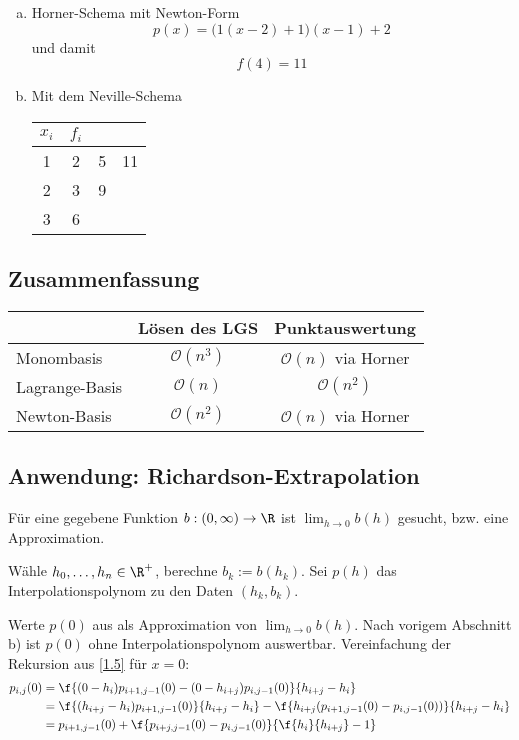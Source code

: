 \documentclass[11pt]{scrbook}
\begin{document}
\begin{ex*}
	\begin{enumerate}[a)]
		\item 
			Horner-Schema mit Newton-Form
			\[
				p(x) = \Big(1(x-2)+1\Big)(x-1) +2
			\]
			und damit
			\[
				f(4) = 11
			\]
		\item
			Mit dem Neville-Schema
			\begin{tabular}{cccc}
				$x_i$ & $f_i$ &  & \\ \hline
				1 & 2 & 5 & 11\\
				2 & 3 & 9\\
				3 & 6
			\end{tabular}
	\end{enumerate}
\end{ex*}

\subsection{Zusammenfassung}

\begin{tabular}{l|c|c}
	 & Lösen des LGS & Punktauswertung\\ \hline
	 Monombasis  & $\mathcal O(n^3)$ & $\mathcal O(n)$ via Horner \\ \hline
	 Lagrange-Basis & $\mathcal O(n)$ & $\mathcal O(n^2)$ \\ \hline
	 Newton-Basis & $\mathcal O(n^2)$ & $\mathcal O(n)$ via Horner
\end{tabular}

\subsection{Anwendung: Richardson-Extrapolation}

Für eine gegebene Funktion $b:(0,\infty)\to \R$ ist $\lim_{h\to 0} b(h)$ gesucht, bzw. eine Approximation.

\begin{seg}[Ansatz:]
Wähle $h_0,\dotsc, h_n \in \R^+$, berechne $b_k := b(h_k)$.
Sei $p(h)$ das Interpolationspolynom zu den Daten $(h_k,b_k)$.

Werte $p(0)$ aus als Approximation von $\lim_{h\to 0} b(h)$.
Nach vorigem Abschnitt b) ist $p(0)$ ohne Interpolationspolynom auswertbar.
Vereinfachung der Rekursion aus \ref{1.5} für $x=0$:
\begin{align*}
	p_{i,j}(0) &= \f {(0-h_i)p_{i+1,j-1}(0) - (0-h_{i+j})p_{i,j-1}(0)}{h_{i+j}-h_i} \\
	&= \f {(h_{i+j}-h_i)p_{i+1,j-1}(0)}{h_{i+j}-h_i} - \f {h_{i+j}(p_{i+1,j-1}(0)-p_{i,j-1}(0))}{h_{i+j}-h_i}\\
	&= p_{i+1,j-1}(0) + \f {p_{i+j,j-1}(0) -p_{i,j-1}(0)}{\f {h_i}{h_{i+j}} - 1}
\end{align*}
\end{seg}
\end{document}
